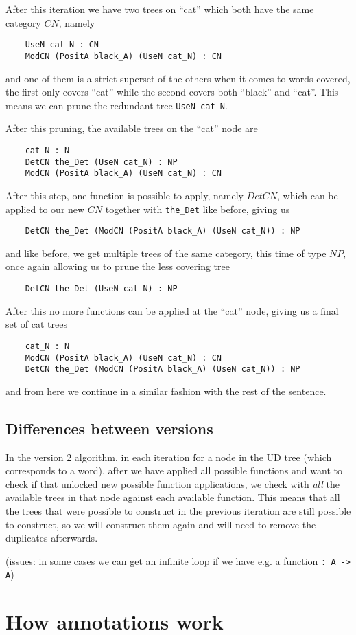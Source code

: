 After this iteration we have two trees on ``cat'' which both have the same category $CN$, namely
\begin{lstlisting}
    UseN cat_N : CN
    ModCN (PositA black_A) (UseN cat_N) : CN
\end{lstlisting}
and one of them is a strict superset of the others when it comes to words covered, the first only covers ``cat'' while the second covers both ``black'' and ``cat''. This means we can prune the redundant tree \lstinline{UseN cat_N}.

After this pruning, the available trees on the ``cat'' node are
\begin{lstlisting}
    cat_N : N
    DetCN the_Det (UseN cat_N) : NP
    ModCN (PositA black_A) (UseN cat_N) : CN
\end{lstlisting}
After this step, one function is possible to apply, namely $DetCN$, which can be applied to our new $CN$ together with \lstinline{the_Det} like before, giving us
\begin{lstlisting}
    DetCN the_Det (ModCN (PositA black_A) (UseN cat_N)) : NP
\end{lstlisting}
and like before, we get multiple trees of the same category, this time of type $NP$, once again allowing us to prune the less covering tree
\begin{lstlisting}
    DetCN the_Det (UseN cat_N) : NP
\end{lstlisting}

After this no more functions can be applied at the ``cat'' node, giving us a final set of cat trees
\begin{lstlisting}
    cat_N : N
    ModCN (PositA black_A) (UseN cat_N) : CN
    DetCN the_Det (ModCN (PositA black_A) (UseN cat_N)) : NP
\end{lstlisting}

and from here we continue in a similar fashion with the rest of the sentence.



\subsection{Differences between versions}

In the version 2 algorithm, in each iteration for a node in the UD tree (which corresponds to a word), after we have applied all possible functions and want to check if that unlocked new possible function applications, we check with \emph{all} the available trees in that node against each available function. This means that all the trees that were possible to construct in the previous iteration are still possible to construct, so we will construct them again and will need to remove the duplicates afterwards.



(issues: in some cases we can get an infinite loop if we have e.g. a function \lstinline{: A -> A})



\section{How annotations work}